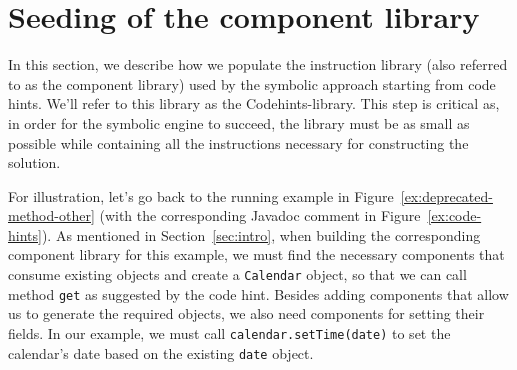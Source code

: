 \documentclass[sigconf,review,anonymous]{acmart}
\begin{document}
  


\section{Seeding of the component library} \label{sec:components-seeding}

In this section, we describe how we populate the instruction library (also referred to as the component library)
used by the symbolic approach starting from code hints. We'll refer to this library as the Codehints-library.
This step is critical as, in order for the symbolic engine to succeed, the library must be as small as possible
while containing all the instructions necessary
for constructing the solution.

For illustration, let's go back to the running example in Figure~\ref{ex:deprecated-method-other} (with the corresponding Javadoc comment in Figure~\ref{ex:code-hints}).
%
As mentioned in Section~\ref{sec:intro}, when building the corresponding component library for this example, 
%
we must find the necessary
components that consume existing objects and create a \lstinline[breaklines=true]{Calendar} object, so that we can call method \lstinline[breaklines=true]{get} as suggested by the code hint.
Besides adding components that allow us to generate the required objects, we also need components for setting their
fields. In our example, we must call
\lstinline[breaklines=true]{calendar.setTime(date)} to set the calendar's date
based on the existing \lstinline[breaklines=true]{date} object.
\end{document}
